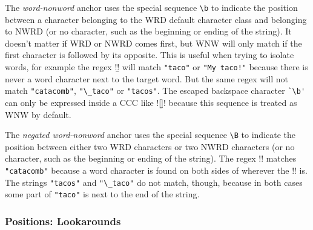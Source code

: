 \begin{description} \itemsep -1pt

\item[WNW:] The \emph{word-nonword} anchor uses the special sequence \verb!\b! to indicate the position between a character belonging to the WRD default character class and belonging to NWRD (or no character, such as the beginning or ending of the string).  It doesn't matter if WRD or NWRD comes first, but WNW will only match if the first character is followed by its opposite.  This is useful when trying to isolate words, for example the regex \cverb!\btaco\b! will match \verb!"taco"! or \verb|"My taco!"|  because there is never a word character next to the target word.  But the same regex will not match \verb!"catacomb"!, \verb!"\_taco"! or \verb!"tacos"!.  The escaped backspace character \verb!`\b'! can only be expressed inside a CCC like \cverb![\b]! because this sequence is treated as WNW by default.

\item[NWNW:] The \emph{negated word-nonword} anchor uses the special sequence \verb!\B! to indicate the position between either two WRD characters or two NWRD characters (or no character, such as the beginning or ending of the string).  The regex \cverb!\Btaco\B! matches \verb!"catacomb"! because a word character is found on both sides of wherever the \cverb!\B! is.  The strings \verb!"tacos"! and \verb!"\_taco"! do not match, though, because in both cases some part of \verb!"taco"! is next to the end of the string.
\end{description}

\subsubsection{Positions: Lookarounds}

